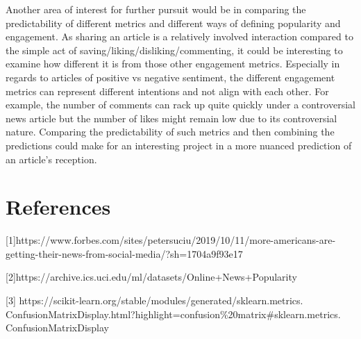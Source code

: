 \documentclass{article}
\begin{document}
Another area of interest for further pursuit would be in comparing the predictability of different metrics and different ways of defining popularity and engagement. As sharing an article is a relatively involved interaction compared to the simple act of saving/liking/disliking/commenting, it could be interesting to examine how different it is from those other engagement metrics. Especially in regards to articles of positive vs negative sentiment, the different engagement metrics can represent different intentions and not align with each other. For example, the number of comments can rack up quite quickly under a controversial news article but the number of likes might remain low due to its controversial nature. Comparing the predictability of such metrics and then combining the predictions could make for an interesting project in a more nuanced prediction of an article's reception. 

\section{References}
[1]https://www.forbes.com/sites/petersuciu/2019/10/11/more-americans-are-
getting-their-news-from-social-media/?sh=1704a9f93e17 

[2]https://archive.ics.uci.edu/ml/datasets/Online+News+Popularity

[3] https://scikit-learn.org/stable/modules/generated/sklearn.metrics.
ConfusionMatrixDisplay.html?highlight=confusion\%20matrix\#sklearn.metrics.
ConfusionMatrixDisplay
\end{document}
